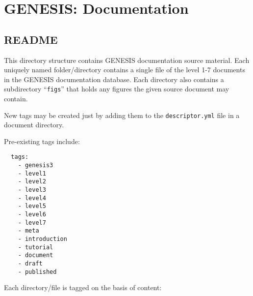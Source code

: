 \documentclass[12pt]{article}
\begin{document}
\section*{GENESIS: Documentation}

\subsection*{README}

This directory structure contains GENESIS documentation source material. Each uniquely named folder/directory contains a single file of the level 1-7 documents in the GENESIS documentation database. Each directory also contains a subdirectory ``{\tt figs}'' that holds any figures the given source document may contain.

New tags may be created just by adding them to the {\tt descriptor.yml} file in a document directory. 

Pre-existing tags include:
\begin{verbatim}
  tags:
    - genesis3
    - level1
    - level2
    - level3
    - level4
    - level5
    - level6
    - level7
    - meta
    - introduction
    - tutorial
    - document
    - draft
    - published
\end{verbatim}
Each directory/file is tagged on the basis of content:
\end{document}
